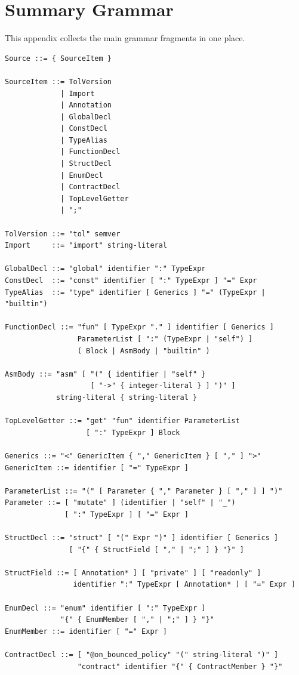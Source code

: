\documentclass[12pt,oneside]{article}
\begin{document}
\appendix
\section{Summary Grammar}
This appendix collects the main grammar fragments in one place.

\begin{verbatim}
Source ::= { SourceItem }

SourceItem ::= TolVersion
             | Import
             | Annotation
             | GlobalDecl
             | ConstDecl
             | TypeAlias
             | FunctionDecl
             | StructDecl
             | EnumDecl
             | ContractDecl
             | TopLevelGetter
             | ";"

TolVersion ::= "tol" semver
Import     ::= "import" string-literal

GlobalDecl ::= "global" identifier ":" TypeExpr
ConstDecl  ::= "const" identifier [ ":" TypeExpr ] "=" Expr
TypeAlias  ::= "type" identifier [ Generics ] "=" (TypeExpr | "builtin")

FunctionDecl ::= "fun" [ TypeExpr "." ] identifier [ Generics ]
                 ParameterList [ ":" (TypeExpr | "self") ]
                 ( Block | AsmBody | "builtin" )

AsmBody ::= "asm" [ "(" { identifier | "self" }
                    [ "->" { integer-literal } ] ")" ]
            string-literal { string-literal }

TopLevelGetter ::= "get" "fun" identifier ParameterList
                   [ ":" TypeExpr ] Block

Generics ::= "<" GenericItem { "," GenericItem } [ "," ] ">"
GenericItem ::= identifier [ "=" TypeExpr ]

ParameterList ::= "(" [ Parameter { "," Parameter } [ "," ] ] ")"
Parameter ::= [ "mutate" ] (identifier | "self" | "_")
              [ ":" TypeExpr ] [ "=" Expr ]

StructDecl ::= "struct" [ "(" Expr ")" ] identifier [ Generics ]
               [ "{" { StructField [ "," | ";" ] } "}" ]

StructField ::= [ Annotation* ] [ "private" ] [ "readonly" ]
                identifier ":" TypeExpr [ Annotation* ] [ "=" Expr ]

EnumDecl ::= "enum" identifier [ ":" TypeExpr ]
             "{" { EnumMember [ "," | ";" ] } "}"
EnumMember ::= identifier [ "=" Expr ]

ContractDecl ::= [ "@on_bounced_policy" "(" string-literal ")" ]
                 "contract" identifier "{" { ContractMember } "}"


\end{verbatim}
\end{document}
